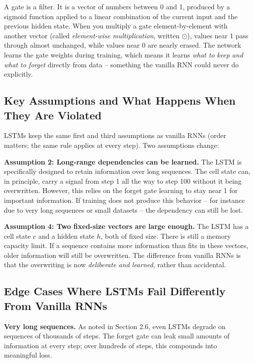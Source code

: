 A gate is a filter. It is a vector of numbers between 0 and 1, produced by a sigmoid
function applied to a linear combination of the current input and the previous hidden
state. When you multiply a gate element-by-element with another vector (called
\textit{element-wise multiplication}, written $\odot$), values near 1 pass through
almost unchanged, while values near 0 are nearly erased. The network learns the gate
weights during training, which means it learns \textit{what to keep and what to
forget} directly from data -- something the vanilla RNN could never do explicitly.

\subsection{Key Assumptions and What Happens When They Are Violated}

LSTMs keep the same first and third assumptions as vanilla RNNs (order matters; the
same rule applies at every step). Two assumptions change:

\textbf{Assumption 2: Long-range dependencies can be learned.} The LSTM is
specifically designed to retain information over long sequences. The cell state can,
in principle, carry a signal from step 1 all the way to step 100 without it being
overwritten. However, this relies on the forget gate learning to stay near 1 for
important information. If training does not produce this behavior -- for instance due to
very long sequences or small datasets -- the dependency can still be lost.

\textbf{Assumption 4: Two fixed-size vectors are large enough.} The LSTM has a
cell state $c$ and a hidden state $h$, both of fixed size. There is still a memory
capacity limit. If a sequence contains more information than fits in these vectors,
older information will still be overwritten. The difference from vanilla RNNs is that
the overwriting is now \textit{deliberate and learned}, rather than accidental.

\subsection{Edge Cases Where LSTMs Fail Differently From Vanilla RNNs}

\textbf{Very long sequences.} As noted in Section 2.6, even LSTMs degrade on
sequences of thousands of steps. The forget gate can leak small amounts of
information at every step; over hundreds of steps, this compounds into meaningful
loss.

